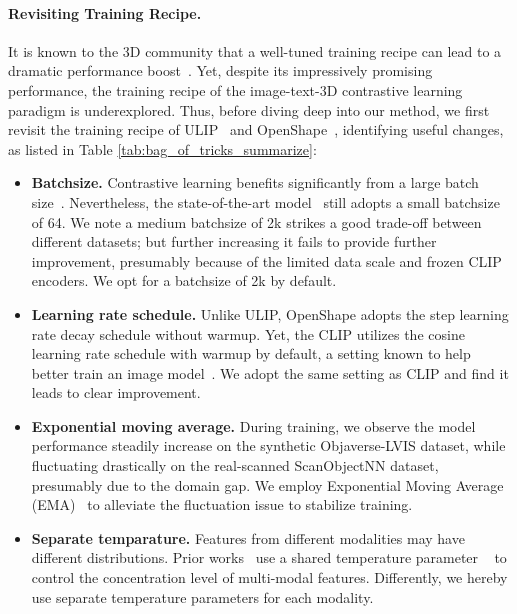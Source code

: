 \documentclass{article} \usepackage{iclr2024_conference,times}
\begin{document}
 \paragraph{Revisiting Training Recipe.}
It is known to the 3D community that a well-tuned training recipe can lead to a dramatic performance boost~\citep{pointnext}. 
Yet, despite its impressively promising performance, the training recipe of the image-text-3D contrastive learning paradigm is underexplored.  
Thus, before diving deep into our method, we first revisit the training recipe of ULIP~\citep{ulip} and OpenShape~\citep{openshape}, identifying useful changes, as listed in Table \ref{tab:bag_of_tricks_summarize}:


\begin{itemize}[leftmargin=*,itemsep=.5ex]
\vspace{-.55em}
    \item \textbf{Batchsize.} Contrastive learning benefits significantly from a large batch size~\citep{openclip,openai_clip}. 
Nevertheless, the state-of-the-art model~\citep{ulip} still adopts a small batchsize of 64. 
We note a medium batchsize of 2k strikes a good trade-off between different datasets; but further increasing it fails to provide further improvement, presumably because of the limited data scale and frozen CLIP encoders. 
We opt for a batchsize of 2k by default.
\item \textbf{Learning rate schedule.} Unlike ULIP, OpenShape adopts the step learning rate decay schedule without warmup. 
Yet, the CLIP utilizes the cosine learning rate schedule with warmup by default, a setting known to help better train an image model~\citep{he2019bag}.
    We adopt the same setting as CLIP and find it leads to clear improvement.
    \item \textbf{Exponential moving average.} During training, we observe the model performance steadily increase on the synthetic Objaverse-LVIS dataset, while fluctuating drastically on the real-scanned ScanObjectNN dataset, presumably due to the domain gap.
We employ Exponential Moving Average (EMA)~\citep{mean_teacher} to alleviate the fluctuation issue to stabilize training.
    \item \textbf{Separate temparature.} 
    Features from different modalities may have different distributions. Prior works~\citep{ulip,openshape} use a shared temperature parameter ~\citep{wu2018unsupervised} to control the concentration level of multi-modal features.
    Differently, we hereby use separate temperature parameters for each modality. 
\end{itemize}
\end{document}
